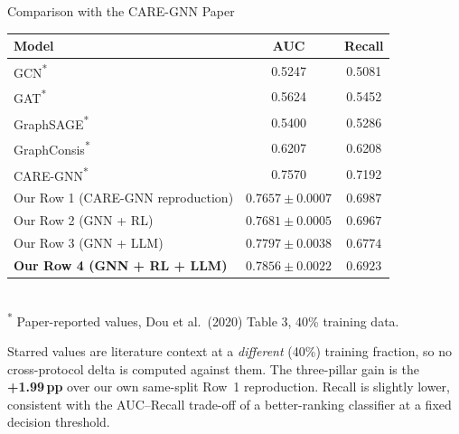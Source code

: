 \documentclass[aspectratio=169,10pt]{beamer}
\begin{document}
\begin{frame}{Comparison with the CARE-GNN Paper}
    \begin{center}\small
    \begin{tabular}{@{}lcc@{}}
        \toprule
        \textbf{Model} & \textbf{AUC} & \textbf{Recall} \\
        \midrule
        GCN\textsuperscript{*}                        & 0.5247 & 0.5081 \\
        GAT\textsuperscript{*}                        & 0.5624 & 0.5452 \\
        GraphSAGE\textsuperscript{*}                  & 0.5400 & 0.5286 \\
        GraphConsis\textsuperscript{*}                & 0.6207 & 0.6208 \\
        CARE-GNN\textsuperscript{*}                   & 0.7570 & 0.7192 \\
        \midrule
        Our Row 1 (CARE-GNN reproduction)             & $0.7657 \pm 0.0007$ & $0.6987$ \\
        Our Row 2 (GNN + RL)                          & $0.7681 \pm 0.0005$ & $0.6967$ \\
        Our Row 3 (GNN + LLM)                         & $0.7797 \pm 0.0038$ & $0.6774$ \\
        \textbf{Our Row 4 (GNN + RL + LLM)}           & $\mathbf{0.7856 \pm 0.0022}$ & $0.6923$ \\
        \bottomrule
    \end{tabular}\\[0.2em]
    \footnotesize \textsuperscript{*} Paper-reported values, Dou et al.\ (2020) Table 3, 40\% training data.
    \end{center}
    \vspace{0.5em}
    \footnotesize
    Starred values are literature context at a \emph{different} (40\%) training
    fraction, so no cross-protocol delta is computed against them. The three-pillar
    gain is the \textbf{+1.99\,pp} over our own same-split Row~1 reproduction.
    Recall is slightly lower, consistent with the AUC--Recall trade-off of a
    better-ranking classifier at a fixed decision threshold.
\end{frame}
\end{document}
